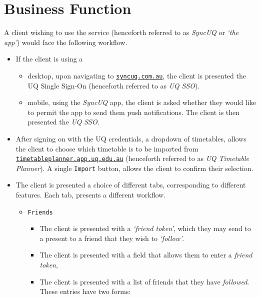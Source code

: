 \documentclass[11pt,a4paper]{report}
\begin{document}
\section{Business Function}

A client wishing to use the service (henceforth referred to as \textit{SyncUQ} or \textit{`the app'}) would face the following workflow.

\begin{itemize}
    \item If the client is using a 
        \begin{itemize} 
            \item desktop, upon navigating to \href{http://www.syncuq.com.au/}{\texttt{syncuq.com.au}}, the client is presented the UQ Single Sign-On (henceforth referred to as \textit{UQ SSO}).
            \item mobile, using the \textit{SyncUQ} app, the client is asked whether they would like to permit the app to send them push notifications. The client is then presented the \textit {UQ SSO}.
        \end{itemize}
    \item After signing on with the UQ credentials, a dropdown of timetables, allows the client to choose which timetable is to be imported from \href{http://timetableplanner.app.uq.edu.au/}{\texttt{timetableplanner.app.uq.edu.au}} (henceforth referred to as \textit{UQ Timetable Planner}). A single \texttt{Import} button, allows the client to confirm their selection.
    \item The client is presented a choice of different tabs, corresponding to different features. Each tab, presents a different workflow.
        \begin{itemize}
            \item \texttt{Friends}
                \begin{itemize}
                    \item The client is presented with a \textit{`friend token'}, which they may send to a present to a friend that they wish to \textit{`follow'}.
                    \item The client is presented with a field that allows them to enter a \textit{friend token}, 
                    \item The client is presented with a list of friends that they have \textit{followed}. These entries have two forms: 
                        \begin{itemize}

\end{itemize}
\end{itemize}
\end{itemize}
\end{itemize}
\end{document}
